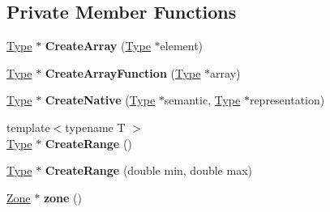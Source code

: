 \subsection*{Private Member Functions}
\begin{DoxyCompactItemize}
\item 
\hyperlink{classv8_1_1internal_1_1_type}{Type} $\ast$ {\bfseries Create\+Array} (\hyperlink{classv8_1_1internal_1_1_type}{Type} $\ast$element)\hypertarget{classv8_1_1internal_1_1_type_cache_a132a84ee6798bc3e60f2f3b7916fb508}{}\label{classv8_1_1internal_1_1_type_cache_a132a84ee6798bc3e60f2f3b7916fb508}

\item 
\hyperlink{classv8_1_1internal_1_1_type}{Type} $\ast$ {\bfseries Create\+Array\+Function} (\hyperlink{classv8_1_1internal_1_1_type}{Type} $\ast$array)\hypertarget{classv8_1_1internal_1_1_type_cache_a7ee7f2fc383b54a9e88bbf6958590f25}{}\label{classv8_1_1internal_1_1_type_cache_a7ee7f2fc383b54a9e88bbf6958590f25}

\item 
\hyperlink{classv8_1_1internal_1_1_type}{Type} $\ast$ {\bfseries Create\+Native} (\hyperlink{classv8_1_1internal_1_1_type}{Type} $\ast$semantic, \hyperlink{classv8_1_1internal_1_1_type}{Type} $\ast$representation)\hypertarget{classv8_1_1internal_1_1_type_cache_ae849136d097c430ba0f1333c921d6330}{}\label{classv8_1_1internal_1_1_type_cache_ae849136d097c430ba0f1333c921d6330}

\item 
{\footnotesize template$<$typename T $>$ }\\\hyperlink{classv8_1_1internal_1_1_type}{Type} $\ast$ {\bfseries Create\+Range} ()\hypertarget{classv8_1_1internal_1_1_type_cache_a4acd2215cc4532ab7f2110975d3c6d79}{}\label{classv8_1_1internal_1_1_type_cache_a4acd2215cc4532ab7f2110975d3c6d79}

\item 
\hyperlink{classv8_1_1internal_1_1_type}{Type} $\ast$ {\bfseries Create\+Range} (double min, double max)\hypertarget{classv8_1_1internal_1_1_type_cache_a069217933a6e3a37b77ec4bc2591b5bc}{}\label{classv8_1_1internal_1_1_type_cache_a069217933a6e3a37b77ec4bc2591b5bc}

\item 
\hyperlink{classv8_1_1internal_1_1_zone}{Zone} $\ast$ {\bfseries zone} ()\hypertarget{classv8_1_1internal_1_1_type_cache_a44bc9a0927c51deca4525452b0bda57a}{}\label{classv8_1_1internal_1_1_type_cache_a44bc9a0927c51deca4525452b0bda57a}

\end{DoxyCompactItemize}
